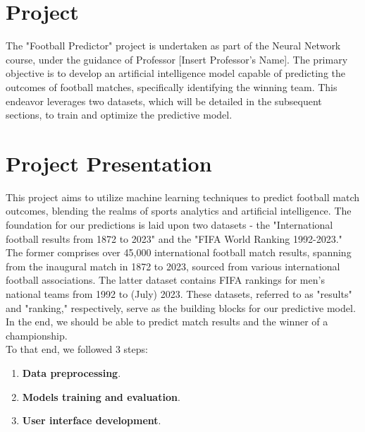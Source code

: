 \documentclass[a4paper,12pt]{article}
\begin{document}
\newpage
\maketitle
\tableofcontents

\newpage
\section{Project}

The "Football Predictor" project is undertaken as part of the Neural Network course, under the guidance of Professor [Insert Professor's Name]. The primary objective is to develop an artificial intelligence model capable of predicting the outcomes of football matches, specifically identifying the winning team. This endeavor leverages two datasets, which will be detailed in the subsequent sections, to train and optimize the predictive model.

\section{Project Presentation}

This project aims to utilize machine learning techniques to predict football match outcomes, blending the realms of sports analytics and artificial intelligence. The foundation for our predictions is laid upon two datasets - the "International football results from 1872 to 2023" and the "FIFA World Ranking 1992-2023." The former comprises over 45,000 international football match results, spanning from the inaugural match in 1872 to 2023, sourced from various international football associations. The latter dataset contains FIFA rankings for men's national teams from 1992 to (July) 2023. These datasets, referred to as "results" and "ranking," respectively, serve as the building blocks for our predictive model.\\

In the end, we should be able to predict match results and the winner of a championship.\\

To that end, we followed 3 steps:
\begin{enumerate}
    \item \textbf{Data preprocessing}.
    \item \textbf{Models training and evaluation}.
    \item \textbf{User interface development}.
\end{enumerate}
\end{document}
